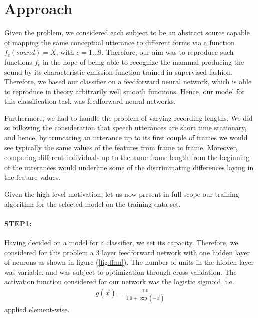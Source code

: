 \documentclass[a4paper,10pt]{article}
\begin{document}
\section{Approach}
Given the problem, we considered each subject to be an abstract source capable of mapping the same conceptual utterance to different forms via a function $f_c(sound) = X$, with $c=1...9$. Therefore, our aim was to reproduce such functions $f_c$ in the hope of being able to recognize the mammal producing the sound by its characteristic emission function trained in supervised fashion. Therefore, we based our classifier on a feedforward neural network, which is able to reproduce in theory arbitrarily well smooth functions. Hence, our model for this classification task was feedforward neural networks.

Furthermore, we had to handle the problem of varying recording lengths. We did so following the consideration that speech utterances are short time stationary, and hence, by truncating an utterance up to its first couple of frames we would see typically the same values of the features from frame to frame. Moreover, comparing different individuals up to the same frame length from the beginning of the utterances would underline some of the discriminating differences laying in the feature values.  

Given the high level motivation, let us now present in full scope our training algorithm for the selected model on the training data set.

\paragraph{STEP1:} Having decided on a model for a classifier, we set its capacity. Therefore, we considered for this problem a 3 layer feedforward network with one hidden layer of neurons as shown in figure (\ref{fig:ffnn}). The number of units in the hidden layer was variable, and was subject to optimization through cross-validation. The activation function considered for our network was the logistic sigmoid, i.e. 
\begin{eqnarray}\label{eq:activ}
g(\vec{x}) = \frac{1.0}{1.0 + \exp({-\vec{x}})}
\end{eqnarray} applied element-wise. 
\end{document}
